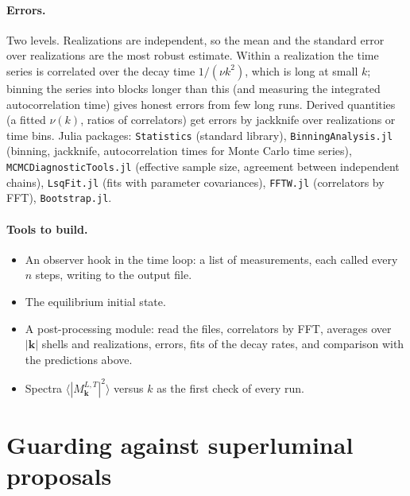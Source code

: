 \documentclass[11pt,aps,preprint,nofootinbib,superscriptaddress,tightenlines]{revtex4-2}
\newcommand{\avg}[1]{\langle #1\rangle}
\let\oldparagraph\paragraph
\renewcommand{\paragraph}{\par\bigskip\oldparagraph}
\begin{document}
\paragraph{Errors.}  Two levels.  Realizations are independent, so the mean
and the standard error over realizations are the most robust estimate.  Within
a realization the time series is correlated over the decay time $1/(\nu k^2)$,
which is long at small $k$; binning the series into blocks longer than this
(and measuring the integrated autocorrelation time) gives honest errors from
few long runs.  Derived quantities (a fitted $\nu(k)$, ratios of correlators)
get errors by jackknife over realizations or time bins.  Julia packages:
\texttt{Statistics} (standard library), \texttt{BinningAnalysis.jl} (binning,
jackknife, autocorrelation times for Monte Carlo time series),
\texttt{MCMCDiagnosticTools.jl} (effective sample size, agreement between
independent chains), \texttt{LsqFit.jl} (fits with parameter covariances),
\texttt{FFTW.jl} (correlators by FFT), \texttt{Bootstrap.jl}.

\paragraph{Tools to build.}
\begin{itemize}
\item An observer hook in the time loop: a list of measurements, each called
  every $n$ steps, writing to the output file.
\item The equilibrium initial state.
\item A post-processing module: read the files, correlators by FFT, averages
  over $|\bm k|$ shells and realizations, errors, fits of the decay rates, and
  comparison with the predictions above.
\item Spectra $\avg{|M^{L,T}_{\bm k}|^2}$ versus $k$ as the first check of every run.
\end{itemize}

\section{Guarding against superluminal proposals}
\label{sec:guard}
\end{document}
